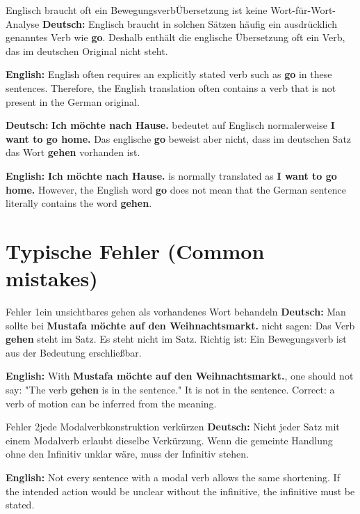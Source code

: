 \documentclass[a4paper,11pt]{article}
\newcommand{\GermanText}[1]{\textbf{Deutsch: }#1\par}
\newcommand{\EnglishText}[1]{{\small\color{SoftGray}\textbf{English: }#1\par}}
\begin{document}
        \begin{grammarentry}{Englisch braucht oft ein Bewegungsverb}{Übersetzung ist keine Wort-für-Wort-Analyse}
            \GermanText{Englisch braucht in solchen Sätzen häufig ein ausdrücklich genanntes Verb wie \textbf{go}. Deshalb enthält die englische Übersetzung oft ein Verb, das im deutschen Original nicht steht.}
            \EnglishText{English often requires an explicitly stated verb such as \textbf{go} in these sentences. Therefore, the English translation often contains a verb that is not present in the German original.}

            \GermanText{\textbf{Ich möchte nach Hause.} bedeutet auf Englisch normalerweise \textbf{I want to go home.} Das englische \textbf{go} beweist aber nicht, dass im deutschen Satz das Wort \textbf{gehen} vorhanden ist.}
            \EnglishText{\textbf{Ich möchte nach Hause.} is normally translated as \textbf{I want to go home.} However, the English word \textbf{go} does not mean that the German sentence literally contains the word \textbf{gehen}.}
        \end{grammarentry}

    \section{Typische Fehler \textnormal{(Common mistakes)}}

        \begin{grammarentry}{Fehler 1}{ein unsichtbares \glqq gehen\grqq{} als vorhandenes Wort behandeln}
            \GermanText{Man sollte bei \textbf{Mustafa möchte auf den Weihnachtsmarkt.} nicht sagen: \glqq Das Verb \textbf{gehen} steht im Satz.\grqq{} Es steht nicht im Satz. Richtig ist: Ein Bewegungsverb ist aus der Bedeutung erschließbar.}
            \EnglishText{With \textbf{Mustafa möchte auf den Weihnachtsmarkt.}, one should not say: "The verb \textbf{gehen} is in the sentence." It is not in the sentence. Correct: a verb of motion can be inferred from the meaning.}
        \end{grammarentry}

        \begin{grammarentry}{Fehler 2}{jede Modalverbkonstruktion verkürzen}
            \GermanText{Nicht jeder Satz mit einem Modalverb erlaubt dieselbe Verkürzung. Wenn die gemeinte Handlung ohne den Infinitiv unklar wäre, muss der Infinitiv stehen.}
            \EnglishText{Not every sentence with a modal verb allows the same shortening. If the intended action would be unclear without the infinitive, the infinitive must be stated.}
        \end{grammarentry}
\end{document}
